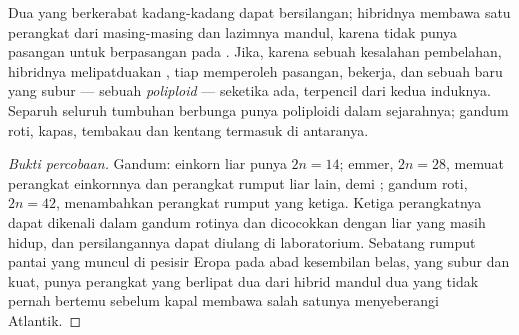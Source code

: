 \begin{proposition}\label{prop:g12:diversification-of-life:polyploidy}
Dua  yang berkerabat kadang-kadang dapat bersilangan; hibridnya
membawa satu perangkat  dari masing-masing dan lazimnya mandul,
karena  tidak punya pasangan untuk berpasangan pada
. Jika, karena sebuah kesalahan pembelahan, hibridnya
melipatduakan , tiap  memperoleh pasangan,
 bekerja, dan sebuah  baru yang subur --- sebuah
\emph{poliploid} --- seketika ada, terpencil dari
kedua induknya. Separuh seluruh  tumbuhan berbunga punya
poliploidi dalam sejarahnya; gandum roti, kapas, tembakau dan kentang
termasuk di antaranya.
\end{proposition}
\begin{proof}[Bukti percobaan]
Gandum: einkorn liar punya $2n = 14$; emmer, $2n = 28$, memuat
perangkat einkornnya dan perangkat rumput liar lain,  demi
; gandum roti, $2n = 42$, menambahkan perangkat rumput yang
ketiga. Ketiga perangkatnya dapat dikenali dalam  gandum
rotinya dan dicocokkan dengan  liar yang masih hidup, dan
persilangannya dapat diulang di laboratorium. Sebatang rumput pantai
yang muncul di pesisir Eropa pada abad kesembilan belas, yang subur dan
kuat, punya perangkat  yang berlipat dua dari hibrid mandul dua
 yang tidak pernah bertemu sebelum kapal membawa salah satunya
menyeberangi Atlantik.
\end{proof}

